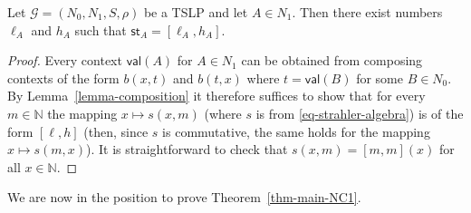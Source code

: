 \documentclass[a4paper,UKenglish,cleveref, autoref, thm-restate, numberwithinsect]{lipics-v2021}
\newcommand{\val}{\mathsf{val}}
\newcommand{\hs}{\mathsf{st}}
\begin{document}
\begin{lemma} \label{lemma-l_B-h_B}
Let $\mathcal{G} = (N_0, N_1, S, \rho)$ be a TSLP and let $A \in N_1$. Then there exist numbers $\ell_A$ and $h_A$ such that 
$\hs_A = [\ell_A, h_A]$.
\end{lemma}

\begin{proof}
Every context $\val(A)$ for $A \in N_1$ can be obtained from composing contexts of the form $b(x,t)$ and $b(t,x)$
where $t = \val(B)$ for some $B \in N_0$. By Lemma~\ref{lemma-composition} it therefore suffices to show that for every $m \in \mathbb{N}$ the
mapping $x \mapsto s(x,m)$ (where $s$ is from \eqref{eq-strahler-algebra})  is of the form $[\ell,h]$ (then, since $s$ is commutative,
the same holds for the mapping  $x \mapsto s(m,x)$). It is straightforward to check that
$s(x,m) = [m,m](x)$ 
for all $x \in \mathbb{N}$.
\end{proof}
We are now in the position to prove Theorem~\ref{thm-main-NC1}.
\end{document}

